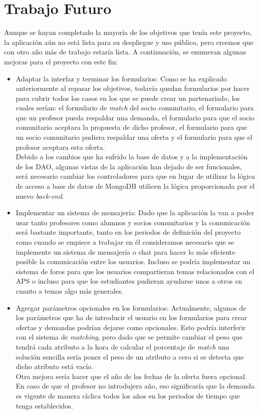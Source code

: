 \documentclass[11pt]{book}
\begin{document}
\section{Trabajo Futuro}
Aunque se hayan completado la mayoría de los objetivos que tenía este proyecto, la aplicación aún no está lista para su despliegue y uso público, pero creemos que con otro año más de trabajo estaría lista. A continuación, se enumeran algunas mejoras para el proyecto con este fin:
\begin{itemize}
	\item Adaptar la interfaz y terminar los formularios: Como se ha explicado anteriormente al repasar los objetivos, todavía quedan formularios por hacer para cubrir todos los casos en los que se puede crear un partenariado, los cuales serían: el formulario de \emph{match} del socio comunitario, el formulario para que un profesor pueda respaldar una demanda, el formulario para que el socio comunitario aceptara la propuesta de dicho profesor, el formulario para que un socio comunitario pudiera respaldar una oferta y el formulario para que el profesor aceptara esta oferta.\\
	Debido a los cambios que ha sufrido la base de datos y a la implementación de los DAO, algunas vistas de la aplicación han dejado de ser funcionales, será necesario cambiar los controladores para que en lugar de utilizar la lógica de acceso a base de datos de MongoDB utilicen la lógica proporcionada por el nuevo \emph{back-end}.
	\item Implementar un sistema de mensajería: Dado que la aplicación la van a poder usar tanto profesores como alumnos y socios comunitarios y la comunicación será bastante importante, tanto en los periodos de definición del proyecto como cuando se empiece a trabajar en él consideramos necesario que se implemente un sistema de mensajería o chat para hacer lo más eficiente posible la comunicación entre los usuarios. Incluso se podría implementar un sistema de foros para que los usuarios compartieran temas relacionados con el APS o incluso para que los estudiantes pudieran ayudarse unos a otros en cuanto a temas algo más generales.
	\item Agregar parámetros opcionales en los formularios: Actualmente, algunos de los parámetros que ha de introducir el usuario en los formularios para crear ofertas y demandas podrían dejarse como opcionales. Esto podría interferir con el sistema de \emph{matching}, pero dado que se permite cambiar el peso que tendrá cada atributo a la hora de calcular el porcentaje de \emph{match} una solución sencilla sería poner el peso de un atributo a cero si se detecta que dicho atributo está vacío.\\
	Otra mejora sería hacer que el año de las fechas de la oferta fuera opcional. En caso de que el profesor no introdujera año, eso significaría que la demanda es vigente de manera cíclica todos los años en los periodos de tiempo que tenga establecidos.

\end{itemize}
\end{document}
